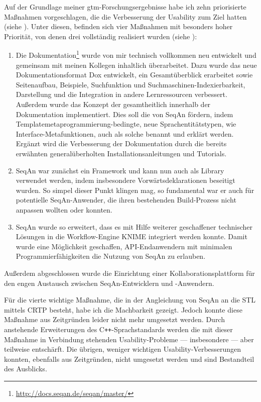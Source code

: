 Auf der Grundlage meiner \gls{gtm}-Forschungsergebnisse habe ich zehn priorisierte Maßnahmen vorgeschlagen, die die Verbesserung der Usability zum Ziel hatten (siehe ). Unter diesen, befinden sich vier Maßnahmen mit besonders hoher Priorität, von denen drei vollständig realisiert wurden (siehe ):
\begin{enumerate}
  \item Die Dokumentation\footnote{\url{http://docs.seqan.de/seqan/master/}} wurde von mir technisch vollkommen neu entwickelt und gemeinsam mit meinen Kollegen inhaltlich überarbeitet. Dazu wurde das neue Dokumentationsformat Dox entwickelt, ein Gesamtüberblick erarbeitet sowie Seitenaufbau, Beispiele, Suchfunktion und Suchmaschinen-Indexierbarkeit, Darstellung und die Integration in andere Lernressourcen verbessert. Außerdem wurde das Konzept der  gesamtheitlich innerhalb der Dokumentation implementiert. Dies soll die  von SeqAn fördern, indem Templatemetaprogrammierung-bedingte, neue Sprachentitätstypen, wie Interface-Metafunktionen, auch als solche benannt und erklärt werden. Ergänzt wird die Verbesserung der Dokumentation durch die bereits erwähnten generalüberholten Installationsanleitungen und Tutorials.

  \item SeqAn war zunächst ein Framework und kann nun auch als Library verwendet werden, indem insbesondere Vorwärtsdeklarationen beseitigt wurden. So simpel dieser Punkt klingen mag, so fundamental war er auch für potentielle SeqAn-Anwender, die ihren bestehenden Build-Prozess nicht anpassen wollten oder konnten.
  
  \item SeqAn wurde so erweitert, dass es mit Hilfe weiterer geschaffener technischer Lösungen in die Workflow-Engine KNIME integriert werden konnte. Damit wurde eine Möglichkeit geschaffen, API-Endanwendern mit minimalen Programmierfähigkeiten die Nutzung von SeqAn zu erlauben.
\end{enumerate}

Außerdem abgeschlossen wurde die Einrichtung einer Kollaborationsplattform für den engen Austausch zwischen SeqAn-Entwicklern und -Anwendern.

Für die vierte wichtige Maßnahme, die in der Angleichung von SeqAn an die STL mittels CRTP besteht, habe ich die Machbarkeit gezeigt. Jedoch konnte diese Maßnahme aus Zeitgründen leider nicht mehr umgesetzt werden. Durch anstehende Erweiterungen des C\texttt{++}-Sprachstandards werden die mit dieser Maßnahme in Verbindung stehenden Usability-Probleme --- insbesondere  --- aber teilweise entschärft. Die übrigen, weniger wichtigen Usability-Verbesserungen konnten, ebenfalls aus Zeitgründen, nicht umgesetzt werden und sind Bestandteil des Ausblicks.


